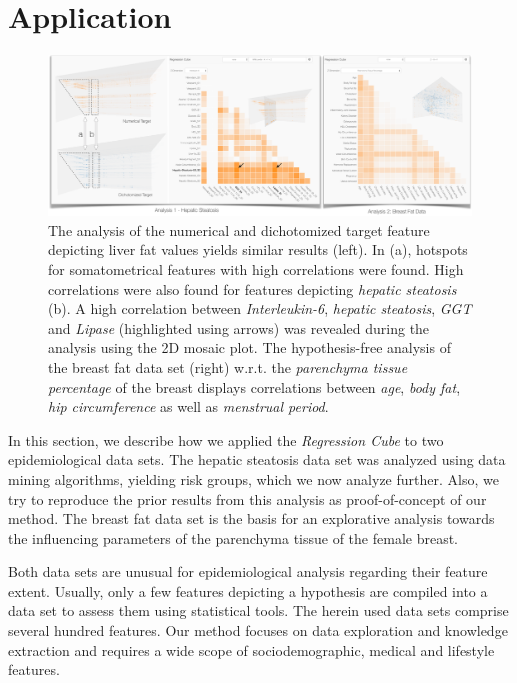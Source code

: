 \documentclass[journal]{style/vgtc} 			          %
\begin{document}
\section{Application} \label{application}
\begin{figure}[htb]
 \centering
 \includegraphics[width=1.0\linewidth]{figures/application}
 \caption{
 The analysis of the numerical and dichotomized target feature depicting liver fat values yields similar results (left).
 In (a), hotspots for somatometrical features with high correlations were found.
 High correlations were also found for features depicting \emph{hepatic steatosis} (b).
 A high correlation between \emph{Interleukin-6}, \emph{hepatic steatosis}, \emph{GGT} and \emph{Lipase} (highlighted using arrows) was revealed during the analysis using the 2D mosaic plot.
 The hypothesis-free analysis of the breast fat data set (right) w.r.t. the \emph{parenchyma tissue percentage} of the breast displays correlations between \emph{age}, \emph{body fat}, \emph{hip circumference} as well as \emph{menstrual period}.
 }
  \label{fig:Application}
\end{figure}
In this section, we describe how we applied the \emph{Regression Cube} to two epidemiological data sets.
The hepatic steatosis data set was analyzed using data mining algorithms, yielding risk groups, which we now analyze further.
Also, we try to reproduce the prior results from this analysis as proof-of-concept of our method.
The breast fat data set is the basis for an explorative analysis towards the influencing parameters of the parenchyma tissue of the female breast.

Both data sets are unusual for epidemiological analysis regarding their feature extent.
Usually, only a few features depicting a hypothesis are compiled into a data set to assess them using statistical tools.
The herein used data sets comprise several hundred features.
Our method focuses on data exploration and knowledge extraction and requires a wide scope of sociodemographic, medical and lifestyle features.
\end{document}
